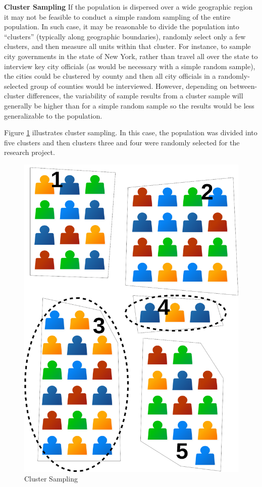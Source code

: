 \textbf{Cluster Sampling} If the population is dispersed over a wide geographic region it may not be feasible to conduct a simple random sampling of the entire population. In such case, it may be reasonable to divide the population into ``clusters'' (typically along geographic boundaries), randomly select only a few clusters, and then measure all units within that cluster. For instance, to sample city governments in the state of New York, rather than travel all over the state to interview key city officials (as would be necessary with a simple random sample), the cities could be clustered by county and then all city officials in a randomly-selected group of counties would be interviewed. However, depending on between-cluster differences, the variability of sample results from a cluster sample will generally be higher than for a simple random sample so the results would be less generalizable to the population.

Figure \ref{07:fig05} illustrates cluster sampling. In this case, the population was divided into five clusters and then clusters three and four were randomly selected for the research project.

\begin{figure}[H]
	\centering
	\includegraphics[width=\maxwidth{.35\linewidth}]{gfx/07-05}
	\caption{Cluster Sampling}
	\label{07:fig05}
\end{figure}

